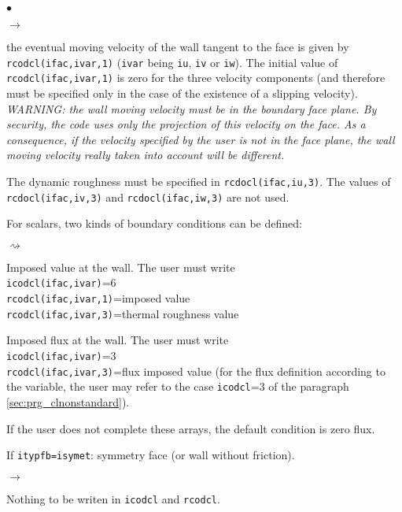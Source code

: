 {{{\begin{list}{$\bullet$}{}
\begin{list}{$\rightarrow$}{}
\item the eventual moving velocity of the wall tangent to the face is
      given by \texttt{rcodcl(ifac,ivar,1)} (\texttt{ivar} being
      \texttt{iu}, \texttt{iv} or \texttt{iw}). The initial
      value of \texttt{rcodcl(ifac,ivar,1)} is zero for
      the three velocity components (and therefore must be specified
      only in the case of the existence of a slipping velocity). \\
{\em WARNING: the wall moving velocity must be in the boundary face
      plane. By security, the code uses only the projection of this
      velocity on the face. As a consequence, if the velocity specified
      by the user is not in the face plane, the wall moving velocity really
      taken into account will be different.}
\item The dynamic roughness must be specified in \texttt{rcdocl(ifac,iu,3)}.
      The values of \texttt{rcdocl(ifac,iv,3)} and
      \texttt{rcdocl(ifac,iw,3)} are not used.
\item For scalars, two kinds of boundary conditions can be defined:
\begin{list}{$\rightsquigarrow$}{}
\item Imposed value at the wall. The user must write\\
\hspace*{1cm}\texttt{icodcl(ifac,ivar)}=6\\
\hspace*{1cm}\texttt{rcodcl(ifac,ivar,1)}=imposed value\\
\hspace*{1cm}\texttt{rcodcl(ifac,ivar,3)}=thermal roughness value\\
\item Imposed flux at the wall. The user must write\\
\hspace*{1cm}\texttt{icodcl(ifac,ivar)}=3\\
\hspace*{1cm}\texttt{rcodcl(ifac,ivar,3)}=flux imposed value (for the flux
      definition according to the variable, the user may refer to the
      case \texttt{icodcl}=3 of the paragraph \ref{sec:prg_clnonstandard}).
\item If the user does not complete these arrays, the default condition
      is zero flux.
\end{list}
\end{list}
\item If \texttt{itypfb=isymet}: symmetry face (or wall without friction).
\begin{list}{$\rightarrow$}{}
\item Nothing to be writen in \texttt{icodcl} and  \texttt{rcodcl}.
\end{list}


\end{list}}}}
